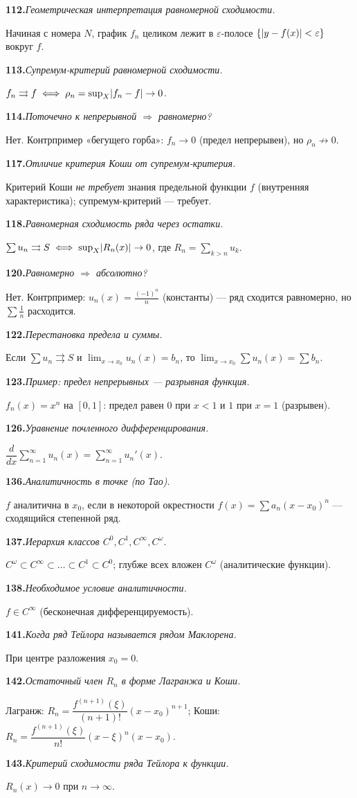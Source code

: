 \documentclass[10pt,a4paper]{article}
\newcommand{\eps}{\varepsilon}
\DeclarePairedDelimiter{\abs}{\lvert}{\rvert}
\theoremstyle{definition}
\theoremstyle{plain}
\newcommand{\writespace}{\vspace{7.5mm}}
\newcommand{\faq}[3]{%
  \par\smallskip\noindent
  \textbf{#1.}\enspace\textit{#2}\par
  \nobreak\vspace{0.3ex}\noindent #3\par
  \writespace}
\begin{document}
\faq{112}{Геометрическая интерпретация равномерной сходимости.}{%
Начиная с номера $N$, график $f_n$ целиком лежит в $\eps$-полосе $\{\abs{y-f(x)}<\eps\}$ вокруг
$f$.}

\faq{113}{Супремум-критерий равномерной сходимости.}{%
$f_n\rightrightarrows f\iff\rho_n=\sup_X\abs{f_n-f}\to0$.}

\faq{114}{Поточечно к непрерывной $\Rightarrow$ равномерно?}{%
Нет. Контрпример «бегущего горба»: $f_n\to0$ (предел непрерывен), но $\rho_n\not\to0$.}

\faq{117}{Отличие критерия Коши от супремум-критерия.}{%
Критерий Коши \emph{не требует} знания предельной функции $f$ (внутренняя характеристика);
супремум-критерий — требует.}

\faq{118}{Равномерная сходимость ряда через остатки.}{%
$\sum u_n\rightrightarrows S\iff\sup_X\abs{R_n(x)}\to0$, где $R_n=\sum_{k>n}u_k$.}

\faq{120}{Равномерно $\Rightarrow$ абсолютно?}{%
Нет. Контрпример: $u_n(x)=\frac{(-1)^n}{n}$ (константы) — ряд сходится равномерно, но $\sum\frac1n$
расходится.}

\faq{122}{Перестановка предела и суммы.}{%
Если $\sum u_n\rightrightarrows S$ и $\lim_{x\to x_0}u_n(x)=b_n$, то
$\lim_{x\to x_0}\sum u_n(x)=\sum b_n$.}

\faq{123}{Пример: предел непрерывных — разрывная функция.}{%
$f_n(x)=x^n$ на $[0,1]$: предел равен $0$ при $x<1$ и $1$ при $x=1$ (разрывен).}

\faq{126}{Уравнение почленного дифференцирования.}{%
$\dfrac{d}{dx}\sum_{n=1}^\infty u_n(x)=\sum_{n=1}^\infty u_n'(x)$.}

\faq{136}{Аналитичность в точке (по Тао).}{%
$f$ аналитична в $x_0$, если в некоторой окрестности $f(x)=\sum a_n(x-x_0)^n$ — сходящийся
степенной ряд.}

\faq{137}{Иерархия классов $C^0,C^1,C^\infty,C^\omega$.}{%
$C^\omega\subset C^\infty\subset\dots\subset C^1\subset C^0$; глубже всех вложен $C^\omega$
(аналитические функции).}

\faq{138}{Необходимое условие аналитичности.}{%
$f\in C^\infty$ (бесконечная дифференцируемость).}

\faq{141}{Когда ряд Тейлора называется рядом Маклорена.}{%
При центре разложения $x_0=0$.}

\faq{142}{Остаточный член $R_n$ в форме Лагранжа и Коши.}{%
Лагранж: $R_n=\dfrac{f^{(n+1)}(\xi)}{(n+1)!}(x-x_0)^{n+1}$; Коши:
$R_n=\dfrac{f^{(n+1)}(\xi)}{n!}(x-\xi)^n(x-x_0)$.}

\faq{143}{Критерий сходимости ряда Тейлора к функции.}{%
$R_n(x)\to0$ при $n\to\infty$.}
\end{document}
